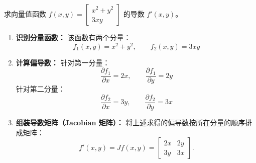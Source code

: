\documentclass[lang=cn,11pt]{elegantbook}
\begin{document}
\begin{exercise}
求向量值函数 $f(x,y) = \begin{bmatrix} x^2+y^2 \\ 3xy \end{bmatrix}$ 的导数 $f'(x,y)$。
\end{exercise}
\begin{solution}
\begin{enumerate}
  \item \textbf{识别分量函数：}
  该函数有两个分量：
  \[
  f_1(x,y) = x^2+y^2, \qquad f_2(x,y) = 3xy
  \]
  
  \item \textbf{计算偏导数：}
  针对第一分量：
  \[
  \frac{\partial f_1}{\partial x} = 2x, \qquad \frac{\partial f_1}{\partial y} = 2y
  \]
  针对第二分量：
  \[
  \frac{\partial f_2}{\partial x} = 3y, \qquad \frac{\partial f_2}{\partial y} = 3x
  \]
  
  \item \textbf{组装导数矩阵（Jacobian 矩阵）：}
  将上述求得的偏导数按所在分量的顺序排成矩阵：
  \[
  f'(x,y) = Jf(x,y) = \begin{bmatrix} 2x & 2y \\ 3y & 3x \end{bmatrix}.
  \]
\end{enumerate}
\end{solution}
\end{document}
